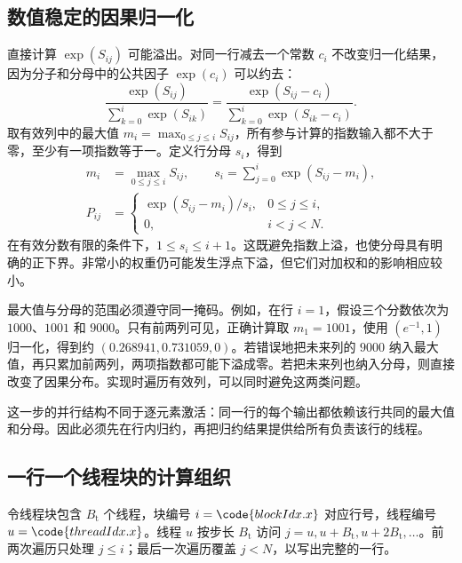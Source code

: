 \subsection{数值稳定的因果归一化}

直接计算 $\exp(S_{ij})$ 可能溢出。对同一行减去一个常数 $c_i$ 不改变归一化结果，因为分子和分母中的公共因子 $\exp(c_i)$ 可以约去：
\begin{equation}
 \frac{\exp(S_{ij})}{\sum_{k=0}^{i}\exp(S_{ik})}
 =\frac{\exp(S_{ij}-c_i)}
 {\sum_{k=0}^{i}\exp(S_{ik}-c_i)}.
 \label{l12:eq:shift-invariance}
\end{equation}
取有效列中的最大值 $m_i=\max_{0\leq j\leq i}S_{ij}$，所有参与计算的指数输入都不大于零，至少有一项指数等于一。定义行分母 $s_i$，得到
\begin{equation}
\begin{aligned}
 m_i&=\max_{0\leq j\leq i}S_{ij},\qquad
 s_i=\sum_{j=0}^{i}\exp(S_{ij}-m_i),\\
 P_{ij}&=\begin{cases}
 \exp(S_{ij}-m_i)/s_i,&0\leq j\leq i,\\
 0,&i<j<N.
 \end{cases}
\end{aligned}
\label{l12:eq:stable-causal}
\end{equation}
在有效分数有限的条件下，$1\leq s_i\leq i+1$。这既避免指数上溢，也使分母具有明确的正下界。非常小的权重仍可能发生浮点下溢，但它们对加权和的影响相应较小。

最大值与分母的范围必须遵守同一掩码。例如，在行 $i=1$，假设三个分数依次为 $1000$、$1001$ 和 $9000$。只有前两列可见，正确计算取 $m_1=1001$，使用 $(e^{-1},1)$ 归一化，得到约 $(0.268941,0.731059,0)$。若错误地把未来列的 $9000$ 纳入最大值，再只累加前两列，两项指数都可能下溢成零。若把未来列也纳入分母，则直接改变了因果分布。实现时遍历有效列，可以同时避免这两类问题。

这一步的并行结构不同于逐元素激活：同一行的每个输出都依赖该行共同的最大值和分母。因此必须先在行内归约，再把归约结果提供给所有负责该行的线程。

\subsection{一行一个线程块的计算组织}

令线程块包含 $B_{\mathrm t}$ 个线程，块编号 $i=\code{blockIdx.x}$ 对应行号，线程编号 $u=\code{threadIdx.x}$。线程 $u$ 按步长 $B_{\mathrm t}$ 访问 $j=u,u+B_{\mathrm t},u+2B_{\mathrm t},\ldots$。前两次遍历只处理 $j\leq i$；最后一次遍历覆盖 $j<N$，以写出完整的一行。

